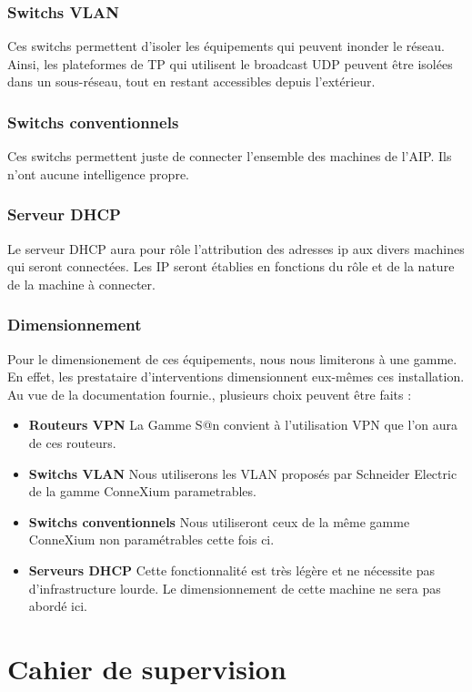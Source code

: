 \documentclass[a4paper]{article}
\begin{document}
	\subsubsection{Switchs VLAN}
Ces switchs permettent d'isoler les équipements qui peuvent inonder le réseau. Ainsi, les plateformes de TP qui utilisent le broadcast UDP peuvent être isolées dans un sous-réseau, tout en restant accessibles depuis l'extérieur.
	
	\subsubsection{Switchs conventionnels}
Ces switchs permettent juste de connecter l'ensemble des machines de l'AIP. Ils n'ont aucune intelligence propre.
	
	\subsubsection{Serveur DHCP}
Le serveur DHCP aura pour rôle l'attribution des adresses ip aux divers machines qui seront connectées. Les IP seront établies en fonctions du rôle et de la nature de la machine à connecter.

	\subsubsection{Dimensionnement}
Pour le dimensionement de ces équipements, nous nous limiterons à une gamme. En effet, les prestataire d'interventions dimensionnent eux-mêmes ces installation.\\
Au vue de la documentation fournie., plusieurs choix peuvent être faits : 
\begin{itemize}
	\item \textbf{Routeurs VPN} La Gamme S@n convient à l'utilisation VPN que l'on aura de ces routeurs.
	\item \textbf{Switchs VLAN} Nous utiliserons les VLAN proposés par Schneider Electric de la gamme ConneXium parametrables. 
	\item \textbf{Switchs conventionnels} Nous utiliseront ceux de la même gamme ConneXium non paramétrables cette fois ci. 
	\item \textbf{Serveurs DHCP} Cette fonctionnalité est très légère et ne nécessite pas d'infrastructure lourde. Le dimensionnement de cette machine ne sera pas abordé ici.
\end{itemize}
	
	
\section{Cahier de supervision}
\end{document}
